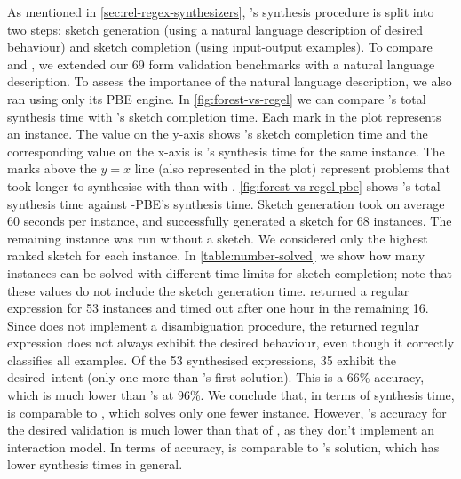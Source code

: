 

As mentioned in \autoref{sec:rel-regex-synthesizers}, \Regel's synthesis procedure is split into two steps: sketch generation (using a natural language description of desired behaviour) and sketch completion (using input-output examples).
%
To compare \Regel and \Forest{}, we extended our 69 form validation benchmarks with a natural language description.
To assess the importance of the natural language description, we also ran \Regel using only its PBE engine. %
%
In \autoref{fig:forest-vs-regel} we can compare \Forest's total synthesis time with \Regel's sketch completion time. Each mark in the plot represents an instance. The value on the y-axis shows \Regel's sketch completion time and the corresponding value on the x-axis is \Forest's synthesis time for the same instance. The marks above the \(y = x\) line (also represented in the plot) represent problems that took longer to synthesise with \Regel than with \Forest.
\autoref{fig:forest-vs-regel-pbe} shows \Forest's total synthesis time against \Regel-PBE's synthesis time.
Sketch generation took on average 60 seconds per instance, and successfully generated a sketch for 68 instances. The remaining instance was run without a sketch.
We considered only the highest ranked sketch for each instance.
In \autoref{table:number-solved} we show how many instances can be solved with different time limits for sketch completion; note that these values do not include the sketch generation time.
%
\Regel{} returned a regular expression for 53 instances and timed out after one hour in the remaining 16.
Since \Regel does not implement a disambiguation procedure, the returned regular expression does not always exhibit the desired behaviour, even though it correctly classifies all examples.
Of the 53 synthesised expressions, 35 exhibit the desired~intent (only one more than \Forest's first solution).
This is a 66\% accuracy, which is much lower than \Forest's at 96\%. 
We conclude that, in terms of synthesis time, \Regel is comparable to \Forest, which solves only one fewer instance. However, \Regel's accuracy for the desired validation is much lower than that of \Forest, as they don't implement an interaction model. In terms of accuracy, \Regel is comparable to \Forest's  solution, which has lower synthesis times in general.

